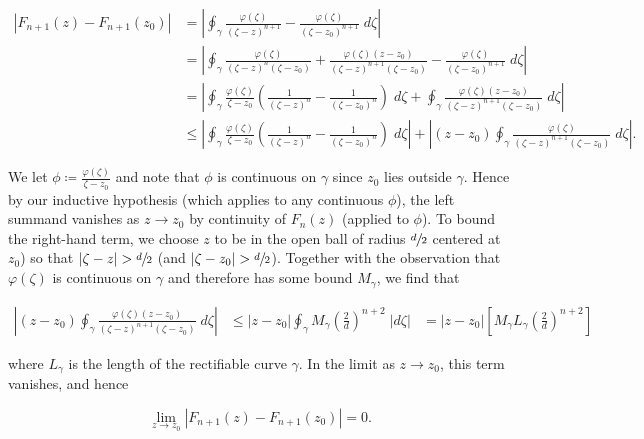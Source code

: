 \begin{solution}
    \begin{align*}
        \left|F_{n+1}(z) - F_{n+1}(z_0)\right| 
          &= \left|\oint_{\gamma} {\frac{\varphi(\zeta)}{(\zeta - z)^{n+1}} - \frac{\varphi(\zeta)}{(\zeta - z_0)^{n+1}} \; d\zeta} \right| \\
          &= \left|\oint_{\gamma} {\frac{\varphi(\zeta)}{(\zeta - z)^{n}(\zeta - z_0)} + \frac{\varphi(\zeta)(z - z_0)}{(\zeta - z)^{n+1}(\zeta - z_0)} - \frac{\varphi(\zeta)}{(\zeta - z_0)^{n+1}} \; d\zeta} \right| \\
          &= \left|\oint_{\gamma} {\frac{\varphi(\zeta)}{\zeta - z_0}\left(\frac{1}{(\zeta - z)^{n}} - \frac{1}{(\zeta - z_0)^{n}} \right) \; d\zeta} + \oint_{\gamma} {\frac{\varphi(\zeta)(z - z_0)}{(\zeta - z)^{n+1}(\zeta - z_0)} \; d\zeta} \right| \\
          &\le \left|\oint_{\gamma} {\frac{\varphi(\zeta)}{\zeta - z_0}\left(\frac{1}{(\zeta - z)^{n}} - \frac{1}{(\zeta - z_0)^{n}} \right) \; d\zeta} \right| + \left|(z - z_0) \oint_{\gamma} {\frac{\varphi(\zeta)}{(\zeta - z)^{n+1}(\zeta - z_0)} \; d\zeta} \right|.
    \end{align*}

    We let $\phi \coloneqq \frac{\varphi(\zeta)}{\zeta - z_0}$ and note that $\phi$ is continuous on $\gamma$ since
    $z_0$ lies outside $\gamma$. Hence by our inductive hypothesis (which applies to any continuous $\phi$), the left
    summand vanishes as $z \to z_0$ by continuity of $F_n(z)$ (applied to $\phi$). To bound the right-hand term, we 
    choose $z$ to be in the open ball of radius $\sfrac{d}{2}$ centered at $z_0$) so that $|\zeta - z| > \sfrac{d}{2}$ 
    (and $|\zeta - z_0| > \sfrac{d}{2}$). Together with the observation that $\varphi(\zeta)$ is continuous on $\gamma$ 
    and therefore has some bound $M_{\gamma}$, we find that

    \begin{align*}
        \left|(z - z_0) \oint_{\gamma} {\frac{\varphi(\zeta)(z - z_0)}{(\zeta - z)^{n+1}(\zeta - z_0)} \; d\zeta} \right| 
          &\le |z - z_0| \oint_{\gamma} { M_{\gamma} \left(\frac{2}{d}\right)^{n+2} \; |d\zeta| }
          &= |z - z_0| \left[ M_{\gamma} L_{\gamma} \left(\frac{2}{d}\right)^{n+2} \right]
    \end{align*}

    where $L_{\gamma}$ is the length of the rectifiable curve $\gamma$. In the limit as $z \to z_0$, this
    term vanishes, and hence

    $$
    \lim_{z \to z_0} \left|F_{n+1}(z) - F_{n+1}(z_0)\right| = 0.
    $$


\end{solution}
